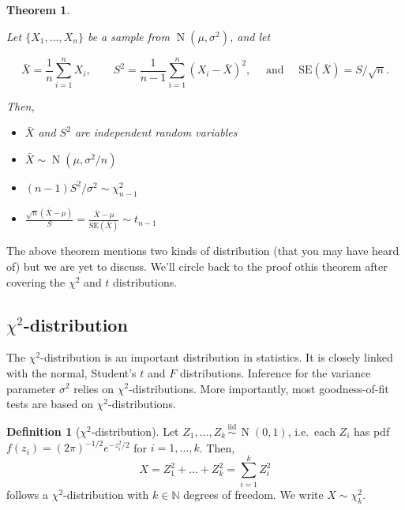 \documentclass[
]{book}
\providecommand{\tightlist}{%
  \setlength{\itemsep}{0pt}\setlength{\parskip}{0pt}}
\DeclareMathOperator{\N}{N}
\newcommand{\iid}{\,\overset{\text{iid}}{\sim}\,}
\newcommand{\bbN}{\mathbb{N}}
\newtheorem{theorem}{Theorem}[chapter]
\theoremstyle{definition}
\newtheorem{definition}{Definition}[chapter]
\theoremstyle{definition}
\theoremstyle{definition}
\theoremstyle{definition}
\theoremstyle{remark}
\begin{document}
\begin{theorem}
\protect\hypertarget{thm:propertynormalsamp}{}\label{thm:propertynormalsamp}

Let \(\{X_1,\dots,X_n \}\) be a sample from \(\N(\mu,\sigma^2)\), and let

\[\bar X = \frac{1}{n}\sum_{i=1}^n X_i, \hspace{2em} 
    S^2 =  \frac{1}{n-1}\sum_{i=1}^n (X_i - \bar X)^2, \hspace{1em} 
    \text{ and } \hspace{1em} \text{SE}(\bar X) = S/\sqrt{n}.\]

Then,

\begin{itemize}
\tightlist
\item
  \(\bar X\) and \(S^2\) are independent random variables
\item
  \(\bar X \sim \N(\mu,\sigma^2/n)\)
\item
  \((n-1)S^2/\sigma^2 \sim \chi^2_{n-1}\)
\item
  \(\frac{\sqrt n (\bar X - \mu)}{S} = \frac{\bar X - \mu}{\text{SE}(\bar X)} \sim t_{n-1}\)
\end{itemize}

\end{theorem}

The above theorem mentions two kinds of distribution (that you may have heard of) but we are yet to discuss.
We'll circle back to the proof othis theorem after covering the \(\chi^2\) and \(t\) distributions.

\hypertarget{chi2-distribution}{%
\subsection{\texorpdfstring{\(\chi^2\)-distribution}{\textbackslash chi\^{}2-distribution}}\label{chi2-distribution}}

The \(\chi^2\)-distribution is an important distribution in statistics.
It is closely linked with the normal, Student's \(t\) and \(F\) distributions. Inference for the variance parameter \(\sigma^2\) relies on \(\chi^2\)-distributions.
More importantly, most goodness-of-fit tests are based on \(\chi^2\)-distributions.

\begin{definition}[\(\chi^2\)-distribution]
\protect\hypertarget{def:chisq}{}\label{def:chisq}Let \(Z_1,\dots,Z_k \iid \N(0,1)\), i.e.~each \(Z_i\) has pdf \(f(z_i) = (2\pi)^{-1/2}e^{-z_i^2/2}\) for \(i=1,\dots,k\).
Then,
\[X = Z_1^2 + \dots + Z_k^2 = \sum_{i=1}^k Z_i^2\]
follows a \(\chi^2\)-distribution with \(k\in\bbN\) degrees of freedom.
We write
\(X \sim \chi^2_k\).
\end{definition}
\end{document}
